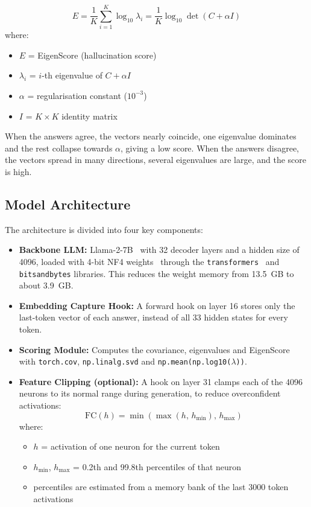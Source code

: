 \documentclass[journal]{IEEEtran}
\begin{document}
\begin{itemize}
\begin{equation}
E=\frac{1}{K}\sum_{i=1}^{K}\log_{10}\lambda_i=\frac{1}{K}\log_{10}\det\left(C+\alpha I\right)
\end{equation}
where:
\begin{itemize}
\item[--] $E$ = EigenScore (hallucination score)
\item[--] $\lambda_i$ = $i$-th eigenvalue of $C+\alpha I$
\item[--] $\alpha$ = regularisation constant ($10^{-3}$)
\item[--] $I$ = $K\times K$ identity matrix
\end{itemize}
\end{itemize}
When the answers agree, the vectors nearly coincide, one eigenvalue dominates and the rest collapse towards $\alpha$, giving a low score. When the answers disagree, the vectors spread in many directions, several eigenvalues are large, and the score is high.

\subsection{Model Architecture}
The architecture is divided into four key components:
\begin{itemize}
\item \textbf{Backbone LLM:} Llama-2-7B~\cite{touvron2023llama2} with 32 decoder layers and a hidden size of 4096, loaded with 4-bit NF4 weights~\cite{dettmers2023qlora} through the \texttt{transformers}~\cite{wolf2020transformers} and \texttt{bitsandbytes} libraries. This reduces the weight memory from 13.5~GB to about 3.9~GB.
\item \textbf{Embedding Capture Hook:} A forward hook on layer 16 stores only the last-token vector of each answer, instead of all 33 hidden states for every token.
\item \textbf{Scoring Module:} Computes the covariance, eigenvalues and EigenScore with \texttt{torch.cov}, \texttt{np.linalg.svd} and \texttt{np.mean(np.log10(}$\lambda$\texttt{))}.
\item \textbf{Feature Clipping (optional):} A hook on layer 31 clamps each of the 4096 neurons to its normal range during generation, to reduce overconfident activations:
\begin{equation}
\mathrm{FC}(h)=\min\left(\max\left(h,\,h_{\min}\right),\,h_{\max}\right)
\end{equation}
where:
\begin{itemize}
\item[--] $h$ = activation of one neuron for the current token
\item[--] $h_{\min}$, $h_{\max}$ = 0.2th and 99.8th percentiles of that neuron
\item[--] percentiles are estimated from a memory bank of the last $3000$ token activations
\end{itemize}
\end{itemize}
\end{document}
